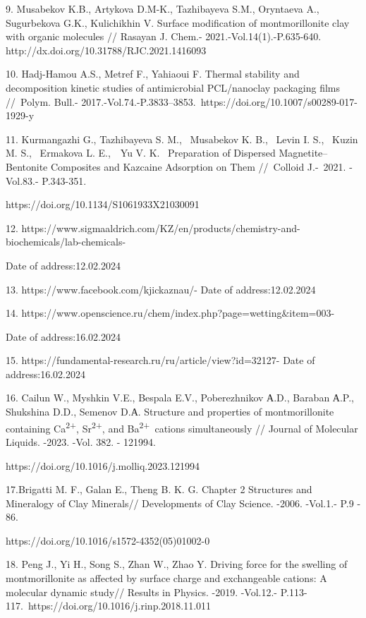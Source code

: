 \begin{noparindent}
9. Musabekov K.B., Artykova D.M-K., Tazhibayeva S.M., Oryntaeva A.,
Sugurbekova G.K., Kulichikhin V. Surface modification of montmorillonite
clay with organic molecules // Rasayan J. Chem.-
2021.-Vol.14(1).-P.635-640. http://dx.doi.org/10.31788/RJC.2021.1416093

10. Hadj-Hamou A.S., Metref F., Yahiaoui F. Thermal stability and
decomposition kinetic studies of antimicrobial PCL/nanoclay packaging
films //~Polym. Bull.-
2017.-Vol.74.-P.3833--3853.~https://doi.org/10.1007/s00289-017-1929-y

11. Kurmangazhi G., Tazhibayeva S. M.,~ Musabekov K. B.,~ Levin I. S.,~
Kuzin M. S.,~ Ermakova L. E.,~~Yu V. K.~ Preparation of Dispersed
Magnetite--Bentonite Composites and Kazcaine Adsorption on Them
//~Colloid J.-~2021. -Vol.83.- P.343-351.

https://doi.org/10.1134/S1061933X21030091

12.
https://www.sigmaaldrich.com/KZ/en/products/chemistry-and-biochemicals/lab-chemicals-

Date of address:12.02.2024

13. https://www.facebook.com/kjickaznau/- Date of address:12.02.2024

14. https://www.openscience.ru/chem/index.php?page=wetting\&item=003-

Date of address:16.02.2024

15. https://fundamental-research.ru/ru/article/view?id=32127- Date of
address:16.02.2024

16. Cailun W., Myshkin V.E., Bespala E.V., Poberezhnikov А.D., Baraban
А.P., Shukshina D.D., Semenov D.А. Structure and properties of
montmorillonite containing Ca\textsuperscript{2+},
Sr\textsuperscript{2+}, and Ba\textsuperscript{2+}~cations
simultaneously // Journal of Molecular Liquids. -2023. -Vol. 382. -
121994.

https://doi.org/10.1016/j.molliq.2023.121994

17.Brigatti M. F., Galan E., Theng B. K. G. Chapter 2 Structures and
Mineralogy of Clay Minerals// Developments of Clay Science. -2006.
-Vol.1.- P.9 - 86.~

https://doi.org/10.1016/s1572-4352(05)01002-0

18. Peng J., Yi H., Song S., Zhan W., Zhao Y. Driving force for the
swelling of montmorillonite as affected by surface charge and
exchangeable cations: A molecular dynamic study// Results in Physics.
-2019. -Vol.12.- P.113-117.~https://doi.org/10.1016/j.rinp.2018.11.011


\end{noparindent}
